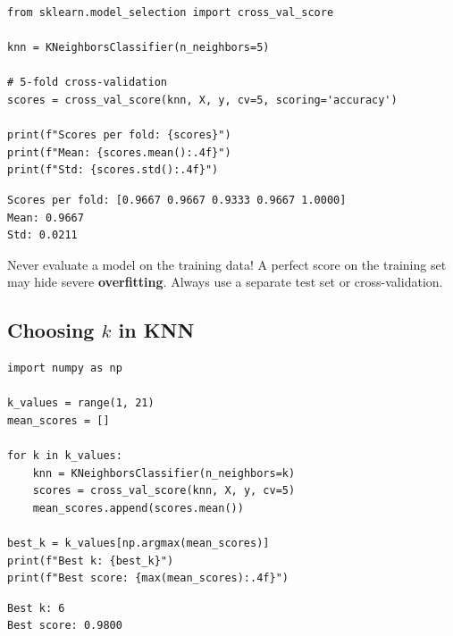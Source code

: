\begin{codeblock}[title=\textbf{Python}]
\begin{verbatim}
from sklearn.model_selection import cross_val_score

knn = KNeighborsClassifier(n_neighbors=5)

# 5-fold cross-validation
scores = cross_val_score(knn, X, y, cv=5, scoring='accuracy')

print(f"Scores per fold: {scores}")
print(f"Mean: {scores.mean():.4f}")
print(f"Std: {scores.std():.4f}")
\end{verbatim}
\end{codeblock}

\begin{codeoutput}
\begin{verbatim}
Scores per fold: [0.9667 0.9667 0.9333 0.9667 1.0000]
Mean: 0.9667
Std: 0.0211
\end{verbatim}
\end{codeoutput}

\begin{warning}
Never evaluate a model on the training data! A perfect score on the training set may hide severe \textbf{overfitting}. Always use a separate test set or cross-validation.
\end{warning}

\subsection{Choosing $k$ in KNN}

\begin{codeblock}[title=\textbf{Python}]
\begin{verbatim}
import numpy as np

k_values = range(1, 21)
mean_scores = []

for k in k_values:
    knn = KNeighborsClassifier(n_neighbors=k)
    scores = cross_val_score(knn, X, y, cv=5)
    mean_scores.append(scores.mean())

best_k = k_values[np.argmax(mean_scores)]
print(f"Best k: {best_k}")
print(f"Best score: {max(mean_scores):.4f}")
\end{verbatim}
\end{codeblock}

\begin{codeoutput}
\begin{verbatim}
Best k: 6
Best score: 0.9800
\end{verbatim}
\end{codeoutput}

